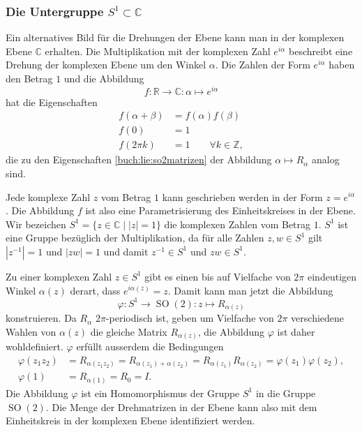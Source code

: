 \subsubsection{Die Untergruppe $S^1\subset\mathbb{C}$}
Ein alternatives Bild für die Drehungen der Ebene kann man in der komplexen
Ebene $\mathbb{C}$ erhalten.
Die Multiplikation mit der komplexen Zahl $e^{i\alpha}$ beschreibt eine
Drehung der komplexen Ebene um den Winkel $\alpha$.
Die Zahlen der Form $e^{i\alpha}$ haben den Betrag $1$ und die Abbildung
\[
f\colon \mathbb{R}\to \mathbb{C}:\alpha \mapsto e^{i\alpha}
\]
hat die Eigenschaften
\begin{equation}
\begin{aligned}
f(\alpha+\beta) &= f(\alpha)f(\beta)
\\
f(0)&=1
\\
f(2\pi k)&=1\qquad\forall k\in\mathbb{Z},
\end{aligned}
\label{buch:lie:so2komplex}
\end{equation}
die zu den Eigenschaften
\eqref{buch:lie:so2matrizen} der Abbildung $\alpha\mapsto R_{\alpha}$ 
analog sind.

Jede komplexe Zahl $z$ vom Betrag $1$ kann geschrieben werden in der Form
$z=e^{i\alpha}$.
Die Abbildung $f$ ist also eine Parametrisierung des
Einheitskreises in der Ebene.
Wir bezeichen $S^1=\{z\in\mathbb{C}\;|\; |z|=1\}$ die komplexen Zahlen vom
Betrag $1$.
$S^1$ ist eine Gruppe bezüglich der Multiplikation, da für alle Zahlen
$z,w\in S^1$ gilt
$|z^{-1}|=1$ und $|zw|=1$ und damit $z^{-1}\in S^1$ und $zw\in S^1$.

Zu einer komplexen Zahl $z\in S^1$ gibt es einen bis auf Vielfache
von $2\pi$ eindeutigen Winkel $\alpha(z)$ derart, dass $e^{i\alpha(z)}=z$.
Damit kann man jetzt die Abbildung
\[
\varphi
\colon
S^1\to \operatorname{SO}(2)
:
z\mapsto  R_{\alpha(z)}
\]
konstruieren.
Da $R_{\alpha}$ $2\pi$-periodisch ist, geben um Vielfache
von $2\pi$ verschiedene Wahlen von $\alpha(z)$ die gleiche
Matrix $R_{\alpha(z)}$, die Abbildung $\varphi$ ist daher
wohldefiniert.
$\varphi$ erfüllt ausserdem die Bedingungen
\begin{align*}
\varphi(z_1z_2)
&=
R_{\alpha(z_1z_2)}
=
R_{\alpha(z_1)+\alpha(z_2)}
=
R_{\alpha(z_1)}R_{\alpha(z_2)}
=
\varphi(z_1)\varphi(z_2),
\\
\varphi(1)
&=
R_{\alpha(1)}
=
R_0
=
I.
\end{align*}
Die Abbildung $\varphi$ ist ein Homomorphismus der Gruppe $S^1$
in die Gruppe $\operatorname{SO}(2)$.
Die Menge der Drehmatrizen in der Ebene kann also mit dem Einheitskreis
in der komplexen Ebene identifiziert werden.

